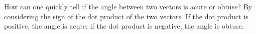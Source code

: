 {How can one quickly tell if the angle between two vectors is acute or obtuse?
}
{By considering the sign of the dot product of the two vectors. If the dot product is positive, the angle is acute; if the dot product is negative, the angle is obtuse.
}
